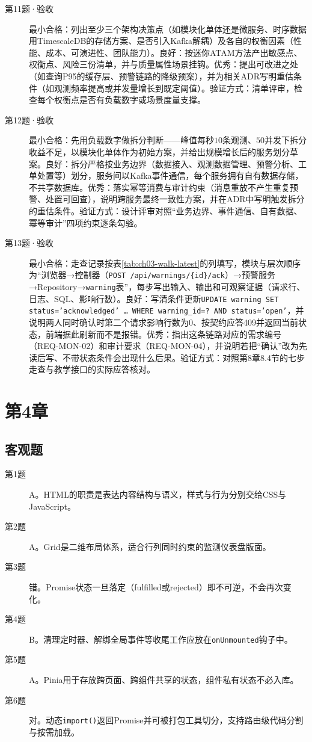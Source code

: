 \begin{description}
\item[第11题·验收] 最小合格：列出至少三个架构决策点（如模块化单体还是微服务、时序数据用TimescaleDB的存储方案、是否引入Kafka解耦）及各自的权衡因素（性能、成本、可演进性、团队能力）。良好：按迷你ATAM方法产出敏感点、权衡点、风险三份清单，并与质量属性场景挂钩。优秀：提出可改进之处（如查询P95的缓存层、预警链路的降级预案），并为相关ADR写明重估条件（如观测频率提高或并发量增长到既定阈值）。验证方式：清单评审，检查每个权衡点是否有负载数字或场景度量支撑。
\item[第12题·验收] 最小合格：先用负载数字做拆分判断——峰值每秒$10$条观测、$50$并发下拆分收益不足，以模块化单体作为初始方案，并给出规模增长后的服务划分草案。良好：拆分严格按业务边界（数据接入、观测数据管理、预警分析、工单处置等）划分，服务间以Kafka事件通信，每个服务拥有自有数据存储，不共享数据库。优秀：落实幂等消费与审计约束（消息重放不产生重复预警、处置可回查），说明跨服务最终一致性方案，并在ADR中写明触发拆分的重估条件。验证方式：设计评审对照“业务边界、事件通信、自有数据、幂等审计”四项约束逐条勾验。
\item[第13题·验收] 最小合格：走查记录按表\ref{tab:ch03-walk-latest}的列填写，模块与层次顺序为“浏览器→控制器（\texttt{POST /api/warnings/\{id\}/ack}）→预警服务→Repository→\texttt{warning}表”，每步写出输入、输出和可观察证据（请求行、日志、SQL、影响行数）。良好：写清条件更新\texttt{UPDATE warning SET status='acknowledged' … WHERE warning\_id=? AND status='open'}，并说明两人同时确认时第二个请求影响行数为0、按契约应答409并返回当前状态，前端据此刷新而不是报错。优秀：指出这条链路对应的需求编号（REQ-MON-02）和审计要求（REQ-MON-04），并说明若把“确认”改为先读后写、不带状态条件会出现什么后果。验证方式：对照第8章8.4节的七步走查与教学接口的实际应答核对。
\end{description}
\section{第4章}

\subsection*{客观题}
\begin{description}
  \item[第1题] A。HTML的职责是表达内容结构与语义，样式与行为分别交给CSS与JavaScript。
  \item[第2题] A。Grid是二维布局体系，适合行列同时约束的监测仪表盘版面。
  \item[第3题] 错。Promise状态一旦落定（fulfilled或rejected）即不可逆，不会再次变化。
  \item[第4题] B。清理定时器、解绑全局事件等收尾工作应放在\texttt{onUnmounted}钩子中。
  \item[第5题] A。Pinia用于存放跨页面、跨组件共享的状态，组件私有状态不必入库。
  \item[第6题] 对。动态\texttt{import()}返回Promise并可被打包工具切分，支持路由级代码分割与按需加载。
\end{description}

